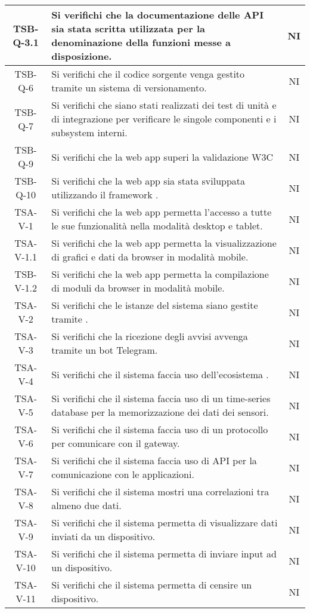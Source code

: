 \begin{center}
\begin{longtable}{|c|p{10cm}|c|}
			 \hline
			 TSB-Q-3.1 & Si verifichi che la documentazione delle API sia stata scritta utilizzata per la denominazione della funzioni messe a disposizione. & NI \\
			 \hline
			 TSB-Q-6 & Si verifichi che il codice sorgente venga gestito tramite un sistema di versionamento. & NI \\
			 \hline
			 TSB-Q-7 & Si verifichi che siano stati realizzati dei test di unità e di integrazione per verificare le singole componenti e i subsystem interni. & NI \\
			 \hline
			 TSB-Q-9 & Si verifichi che la web app superi la validazione W3C & NI \\
			 \hline
			 TSB-Q-10 & Si verifichi che la web app sia stata sviluppata utilizzando il framework \glock{Bootstrap}. & NI \\
			 \hline
			 TSA-V-1 & Si verifichi che la web app permetta l'accesso a tutte le sue funzionalità nella modalità desktop e tablet. & NI \\ 
			 \hline
			 TSA-V-1.1 & Si verifichi che la web app permetta la visualizzazione di grafici e dati da browser in modalità mobile. & NI \\ 
			 \hline
			 TSB-V-1.2 & Si verifichi che la web app permetta la compilazione di moduli da browser in modalità mobile. & NI \\
			 \hline
			 TSA-V-2 & Si verifichi che le istanze del sistema siano gestite tramite \glock{Docker}. & NI \\
			 \hline
			 TSA-V-3 & Si verifichi che la ricezione degli avvisi avvenga tramite un bot Telegram. & NI \\
			 \hline 
			 TSA-V-4 & Si verifichi che il sistema faccia uso dell'ecosistema \glock{Kafka}. & NI \\
			 \hline
			 TSA-V-5 & Si verifichi che il sistema faccia uso di un time-series database per la memorizzazione dei dati dei sensori. & NI \\
			 \hline
			 TSA-V-6 & Si verifichi che il sistema faccia uso di un protocollo per comunicare con il gateway. & NI \\
			 \hline
			 TSA-V-7 & Si verifichi che il sistema faccia uso di API per la comunicazione con le applicazioni. & NI \\
			 \hline
			 TSA-V-8 & Si verifichi che il sistema mostri una correlazioni tra almeno due dati. & NI \\
			 \hline
			 TSA-V-9 & Si verifichi che il sistema permetta di visualizzare dati inviati da un dispositivo. & NI \\
			 \hline
			 TSA-V-10 & Si verifichi che il sistema permetta di inviare input ad un dispositivo. & NI \\
			 \hline
			 TSA-V-11 & Si verifichi che il sistema permetta di censire un dispositivo. & NI \\
			 \hline
			 

\end{longtable}
\end{center}
